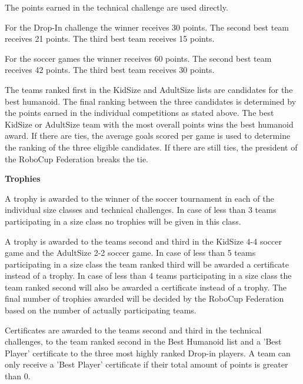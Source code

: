 \bigskip

The points earned in the technical challenge are used directly.

\bigskip

For the Drop-In challenge the winner receives 30 points. The second best team receives 21 points. The third best team receives 15 points.


\bigskip

For the soccer games the winner receives 60 points. The second best team receives 42 points. The third best team receives 30 points.

\bigskip

The teams ranked first in the KidSize and AdultSize lists
are candidates for the best humanoid.
The final ranking between the three candidates is determined by the points
earned in the individual competitions as stated above.
The best KidSize or AdultSize team with the most overall
points wins the best humanoid award.
If there are ties, the average goals scored per game is used to determine the
ranking of the three eligible candidates.
If there are still ties, the president of the RoboCup Federation breaks the tie.

\bigskip

{\bfseries Trophies}

\headlinebox

A trophy is awarded to the winner of the soccer tournament in each of the individual size classes and technical challenges. In case of less than 3 teams participating in a size class no trophies will be given in this class.

\bigskip

A trophy is awarded to the teams second and third in the KidSize 4-4 soccer game
 and the AdultSize 2-2 soccer game.
In case of less than 5 teams participating in a size class the team ranked third
will be awarded a certificate instead of a trophy.
In case of less than 4 teams participating in a size class the team ranked
second will also be awarded a certificate instead of a trophy.
The final number of trophies awarded will be decided by the RoboCup Federation
based on the number of actually participating teams.

\bigskip

Certificates are awarded to the teams second and third in the technical challenges,
to the team ranked second  in the Best Humanoid list
and a 'Best Player' certificate to the three most highly ranked Drop-in players.
A team can only receive a 'Best Player' certificate if their total amount of
points is greater than 0.

